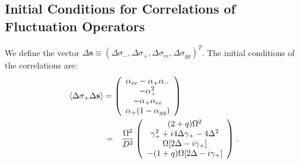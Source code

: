 \documentclass[twocolumn,aps,eqsecnum,showkeys,amsmath]{revtex4-2}
\begin{document}
\subsection{Initial Conditions for Correlations of Fluctuation Operators} 
We define the vector  
$\Delta \mathbf{s} \equiv  \left( \Delta \sigma_-, 
\Delta \sigma_+, \Delta \sigma_{ee}, \Delta \sigma_{gg}  \right)^T$. 
The initial conditions of the correlations are: 
%
\begin{eqnarray} 	 \label{eq:corre2st}
\lefteqn{  \langle \Delta \sigma_+ \Delta \mathbf{s} \rangle = 
\left( \begin{array}{c}  \alpha_{ee} -\alpha_+ \alpha_- \\  -\alpha_+^2 \\ 
-\alpha_+ \alpha_{ee} \\ \alpha_+(1- \alpha_{gg}) \end{array} 	\right)  } 
	\hspace{1.5cm} 	\\
&=& \frac{\Omega^2}{D^2} \left( \begin{array}{c} (2+q) \Omega^2  	\\ 
	\gamma_+^2 +i4\Delta \gamma_+ -4\Delta^2 		\\ 
\Omega [2\Delta -i \gamma_+] 	\\
-(1+q) \Omega [2\Delta -i \gamma_+] 	\end{array} \right) \,. \nonumber
\end{eqnarray} 
 
\end{document}
